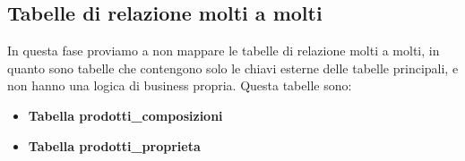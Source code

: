 \documentclass[12pt, a4paper]{article}
\begin{document}
\subsection{Tabelle di relazione molti a molti}
In questa fase proviamo a non mappare le tabelle di relazione molti a molti,
in quanto sono tabelle che contengono solo le chiavi esterne delle tabelle principali, e non hanno una logica di business propria.
Questa tabelle sono:
\begin{itemize}
    \item \textbf{Tabella prodotti\_composizioni}
    \item \textbf{Tabella prodotti\_proprieta}
\end{itemize}
\end{document}
